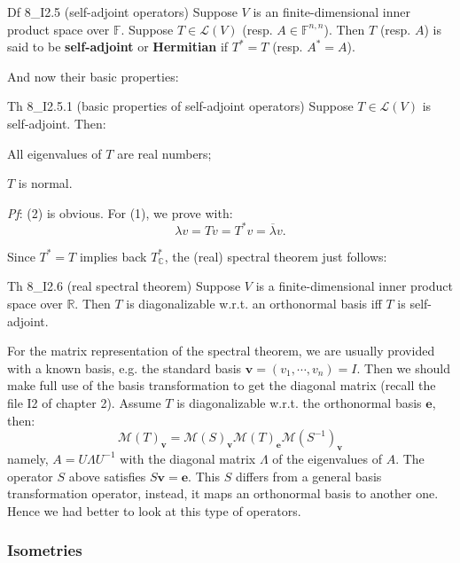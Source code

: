 \documentclass{article}
\begin{document}
\begin{Df}{Df 8\_I2.5 (self-adjoint operators)}
    Suppose $V$ is an finite-dimensional inner product space over $\mathbb{F}$. Suppose $T\in\mathcal{L}(V)$ (resp. $A\in\mathbb{F}^{n,n}$). Then $T$ (resp. $A$) is said to be \textbf{self-adjoint} or \textbf{Hermitian} if $T^\ast = T$ (resp. $A^\ast = A$).
\end{Df}

And now their basic properties:

\begin{Th}{Th 8\_I2.5.1 (basic properties of self-adjoint operators)}
    Suppose $T\in\mathcal{L}(V)$ is self-adjoint. Then:
    \begin{compactenum}
        \item All eigenvalues of $T$ are real numbers;
        \item $T$ is normal.
    \end{compactenum}
    \tcblower
    \textit{Pf}: (2) is obvious. For (1), we prove with:
    $$ \lambda v = Tv = T^\ast v = \overline{\lambda} v. $$
\end{Th}

Since $T^\ast = T$ implies back $T^\ast_{\mathbb{C}}$, the (real) spectral theorem just follows:

\begin{Th}{Th 8\_I2.6 (real spectral theorem)}
    Suppose $V$ is a finite-dimensional inner product space over $\mathbb{R}$. Then $T$ is diagonalizable w.r.t. an orthonormal basis iff $T$ is self-adjoint.
\end{Th}

For the matrix representation of the spectral theorem, we are usually provided with a known basis, e.g. the standard basis $\pmb{v} = (v_1, \cdots, v_n) = I$. Then we should make full use of the basis transformation to get the diagonal matrix (recall the file I2 of chapter 2). Assume $T$ is diagonalizable w.r.t. the orthonormal basis $\pmb{e}$, then:
$$ \mathcal{M}(T)_{\pmb{v}} = \mathcal{M}(S)_{\pmb{v}}\mathcal{M}(T)_{\pmb{e}}\mathcal{M}(S^{-1})_{\pmb{v}} $$
namely, $A = U\Lambda U^{-1}$ with the diagonal matrix $\Lambda$ of the eigenvalues of $A$. The operator $S$ above satisfies $S\pmb{v} = \pmb{e}$. This $S$ differs from a general basis transformation operator, instead, it maps an orthonormal basis to another one. Hence we had better to look at this type of operators.

\subsubsection{Isometries}
\end{document}
